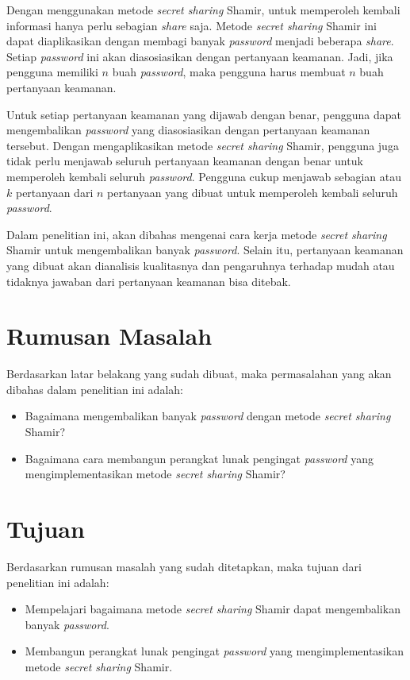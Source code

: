 Dengan menggunakan metode \textit{secret sharing} Shamir, untuk memperoleh kembali informasi hanya perlu sebagian \textit{share} saja. Metode \textit{secret sharing} Shamir ini dapat diaplikasikan dengan membagi banyak \textit{password} menjadi beberapa \textit{share}. Setiap \textit{password} ini akan diasosiasikan dengan pertanyaan keamanan. Jadi, jika pengguna memiliki $n$ buah \textit{password}, maka pengguna harus membuat $n$ buah pertanyaan keamanan.

Untuk setiap pertanyaan keamanan yang dijawab dengan benar, pengguna dapat mengembalikan \textit{password} yang diasosiasikan dengan pertanyaan keamanan tersebut. Dengan mengaplikasikan metode \textit{secret sharing} Shamir, pengguna juga tidak perlu menjawab seluruh pertanyaan keamanan dengan benar untuk memperoleh kembali seluruh \textit{password}. Pengguna cukup menjawab sebagian atau $k$ pertanyaan dari $n$ pertanyaan yang dibuat untuk memperoleh kembali seluruh \textit{password}.

Dalam penelitian ini, akan dibahas mengenai cara kerja metode \textit{secret sharing} Shamir untuk mengembalikan banyak \textit{password}. Selain itu, pertanyaan keamanan yang dibuat akan dianalisis kualitasnya dan pengaruhnya terhadap mudah atau tidaknya jawaban dari pertanyaan keamanan bisa ditebak.

\section{Rumusan Masalah}
\label{sec:rumusanmasalah}

Berdasarkan latar belakang yang sudah dibuat, maka permasalahan yang akan dibahas dalam penelitian ini adalah:
\begin{itemize}
	\item Bagaimana mengembalikan banyak \textit{password} dengan metode \textit{secret sharing} Shamir?
	\item Bagaimana cara membangun perangkat lunak pengingat \textit{password} yang mengimplementasikan metode \textit{secret sharing} Shamir?
\end{itemize}

\section{Tujuan}
\label{sec:tujuan}

Berdasarkan rumusan masalah yang sudah ditetapkan, maka tujuan dari penelitian ini adalah:
\begin{itemize}
	\item Mempelajari bagaimana metode \textit{secret sharing} Shamir dapat mengembalikan banyak \textit{password}.
	\item Membangun perangkat lunak pengingat \textit{password} yang mengimplementasikan metode \textit{secret sharing} Shamir.
\end{itemize}

